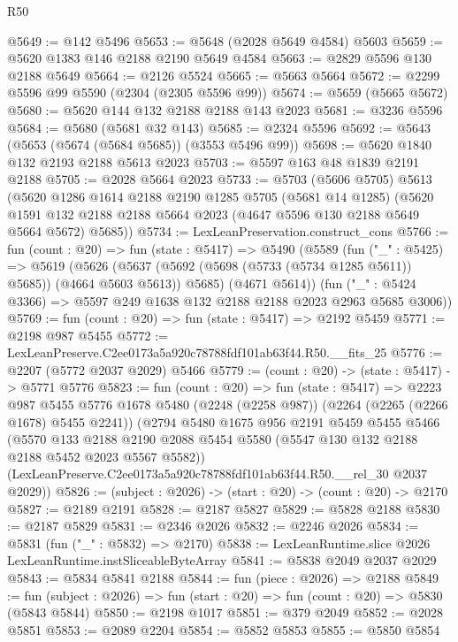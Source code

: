 \begin{lexlean}{R50}
\begin{coremodule}
@5649 := @142 @5496
@5653 := @5648 (@2028 @5649 @4584) @5603
@5659 := @5620 @1383 @146 @2188 @2190 @5649 @4584
@5663 := @2829 @5596 @130 @2188 @5649
@5664 := @2126 @5524
@5665 := @5663 @5664
@5672 := @2299 @5596 @99 @5590 (@2304 (@2305 @5596 @99))
@5674 := @5659 (@5665 @5672)
@5680 := @5620 @144 @132 @2188 @2188 @143 @2023
@5681 := @3236 @5596
@5684 := @5680 (@5681 @32 @143)
@5685 := @2324 @5596
@5692 := @5643 (@5653 (@5674 (@5684 @5685)) (@3553 @5496 @99))
@5698 := @5620 @1840 @132 @2193 @2188 @5613 @2023
@5703 := @5597 @163 @48 @1839 @2191 @2188
@5705 := @2028 @5664 @2023
@5733 := @5703
    (@5606 @5705)
    @5613
    (@5620
      @1286
      @1614
      @2188
      @2190
      @1285
      @5705
      (@5681 @14 @1285)
      (@5620 @1591 @132 @2188 @2188 @5664 @2023 (@4647 @5596 @130 @2188 @5649 @5664 @5672) @5685))
@5734 := LexLeanPreservation.construct_cons
@5766 := fun (count : @20) =>
  fun (state : @5417) =>
  @5490
    (@5589
      (fun ("_" : @5425) =>
      @5619
        (@5626 (@5637 (@5692 (@5698 (@5733 (@5734 @1285 @5611)) @5685)) (@4664 @5603 @5613)) @5685)
        (@4671 @5614))
      (fun ("_" : @5424 @3366) => @5597 @249 @1638 @132 @2188 @2188 @2023 @2963 @5685 @3006))
@5769 := fun (count : @20) => fun (state : @5417) => @2192 @5459
@5771 := @2198 @987 @5455
@5772 := LexLeanPreserve.C2ee0173a5a920c78788fdf101ab63f44.R50.__fits_25
@5776 := @2207 (@5772 @2037 @2029) @5466
@5779 := (count : @20) -> (state : @5417) -> @5771 @5776
@5823 := fun (count : @20) =>
  fun (state : @5417) =>
  @2223
    @987
    @5455
    @5776
    @1678
    @5480
    (@2248 (@2258 @987))
    (@2264 (@2265 (@2266 @1678) @5455 @2241))
    (@2794
      @5480
      @1675
      @956
      @2191
      @5459
      @5455
      @5466
      (@5570
        @133
        @2188
        @2190
        @2088
        @5454
        @5580
        (@5547 @130 @132 @2188 @2188 @5452 @2023 @5567 @5582))
      (LexLeanPreserve.C2ee0173a5a920c78788fdf101ab63f44.R50.__rel_30 @2037 @2029))
@5826 := (subject : @2026) -> (start : @20) -> (count : @20) -> @2170
@5827 := @2189 @2191
@5828 := @2187 @5827
@5829 := @5828 @2188
@5830 := @2187 @5829
@5831 := @2346 @2026
@5832 := @2246 @2026
@5834 := @5831 (fun ("_" : @5832) => @2170)
@5838 := LexLeanRuntime.slice @2026 LexLeanRuntime.instSliceableByteArray
@5841 := @5838 @2049 @2037 @2029
@5843 := @5834 @5841 @2188
@5844 := fun (piece : @2026) => @2188
@5849 := fun (subject : @2026) => fun (start : @20) => fun (count : @20) => @5830 (@5843 @5844)
@5850 := @2198 @1017
@5851 := @379 @2049
@5852 := @2028 @5851
@5853 := @2089 @2204
@5854 := @5852 @5853
@5855 := @5850 @5854

\end{coremodule}
\end{lexlean}
